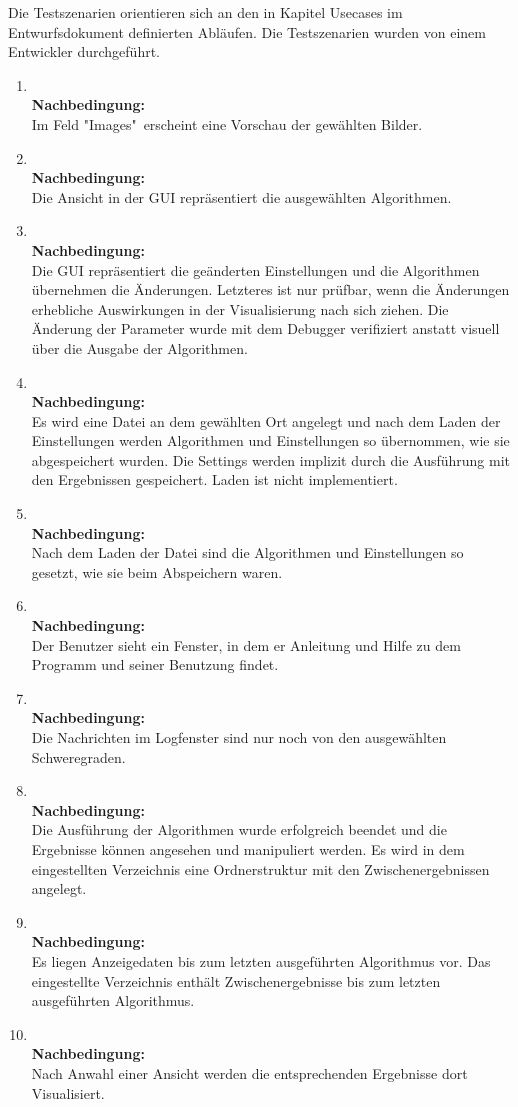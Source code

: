Die Testszenarien orientieren sich an den in Kapitel Usecases im Entwurfsdokument definierten Abläufen. Die Testszenarien wurden von einem Entwickler durchgeführt.
\begin{enumerate}[align=left, leftmargin=4em, label={\textbf{\textbackslash T4.\arabic*\textbackslash}} ]
\newcommand{\testsz}[1]{
	\item \textbf{\usecaseTitle{#1}}\\
	\usecase{#1}
	\textbf{Nachbedingung:}\\
}

\testsz{1} Im Feld "{}Images" erscheint eine Vorschau der gewählten Bilder.
\testsz{2} Die Ansicht in der GUI repräsentiert die ausgewählten Algorithmen.
\testsz{3} Die GUI repräsentiert die geänderten Einstellungen und die Algorithmen übernehmen die Änderungen. Letzteres ist nur prüfbar, wenn die Änderungen erhebliche Auswirkungen in der Visualisierung nach sich ziehen.
 Die Änderung der Parameter wurde mit dem Debugger verifiziert anstatt visuell über die Ausgabe der Algorithmen.
\testsz{4} Es wird eine Datei an dem gewählten Ort angelegt und nach dem Laden der Einstellungen
werden Algorithmen und Einstellungen so übernommen, wie sie abgespeichert wurden.
 Die Settings werden implizit durch die Ausführung mit den Ergebnissen gespeichert. Laden ist nicht implementiert.
\testsz{5} Nach dem Laden der Datei sind die Algorithmen und Einstellungen so gesetzt, wie sie beim Abspeichern waren.
\testsz{6} Der Benutzer sieht ein Fenster, in dem er Anleitung und Hilfe zu dem Programm und seiner Benutzung findet.
\testsz{7} Die Nachrichten im Logfenster sind nur noch von den ausgewählten Schweregraden.
\testsz{8} Die Ausführung der Algorithmen wurde erfolgreich beendet und die Ergebnisse können angesehen und manipuliert werden. Es wird in dem eingestellten Verzeichnis eine Ordnerstruktur mit den Zwischenergebnissen angelegt.
\testsz{9} Es liegen Anzeigedaten bis zum letzten ausgeführten Algorithmus vor. Das eingestellte Verzeichnis enthält Zwischenergebnisse bis zum letzten ausgeführten Algorithmus.
\testsz{10} Nach Anwahl einer Ansicht werden die entsprechenden Ergebnisse dort Visualisiert.
\end{enumerate}